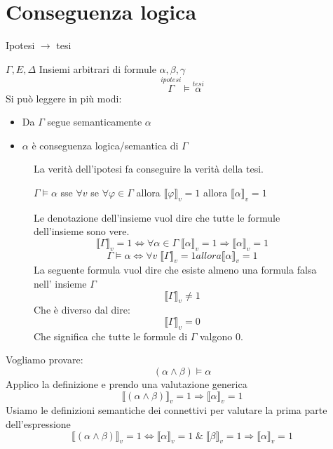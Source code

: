 \documentclass{article}
\theoremstyle{break}
\theoremstyle{break}
\theoremstyle{break}
\theoremstyle{break}
\begin{document}
\section{Conseguenza logica}
\begin{center}
  Ipotesi \( \to  \) tesi
\end{center}
\( \Gamma, E, \Delta \) Insiemi arbitrari di formule \( \alpha, \beta, \gamma \)
\[
  \stackrel{ipotesi}{\Gamma} \models \stackrel{tesi}{\alpha}
\]
Si può leggere in più modi:
\begin{itemize}
  \item Da \( \Gamma \) segue semanticamente \( \alpha \)
  \item \( \alpha \) è conseguenza logica/semantica di \( \Gamma \)
\end{itemize}
\begin{figure}[H]
  \begin{definition}
    La verità dell'ipotesi fa conseguire la verità della tesi.
    \begin{center}
      \( \Gamma \models \alpha \) sse \( \forall v \) se \( \forall \varphi \in \Gamma \) allora \( \llbracket \varphi\rrbracket_v = 1 \) allora \( \llbracket \alpha\rrbracket_v = 1 \)
    \end{center}
    Le denotazione dell'insieme vuol dire che tutte le formule dell'insieme
    sono vere.
    \[
      \llbracket \Gamma\rrbracket_v=1 \Leftrightarrow \forall \alpha \in \Gamma\; \llbracket \alpha\rrbracket_v = 1 \Rightarrow \llbracket \alpha\rrbracket_v = 1
    \]
    \[
      \Gamma \models \alpha \Leftrightarrow \forall v\; \llbracket \Gamma\rrbracket_v=1 allora \llbracket \alpha\rrbracket_v=1
    \]
    La seguente formula vuol dire che esiste almeno una formula falsa nell'
    insieme \( \Gamma \)
    \[
      \llbracket \Gamma\rrbracket_v \neq 1
    \]
    Che è diverso dal dire:
    \[
      \llbracket \Gamma\rrbracket_v = 0
    \]
    Che significa che tutte le formule di \( \Gamma \) valgono 0.
  \end{definition}
\end{figure}

\begin{exercise}[easy]
  Vogliamo provare:
  \[
    (\alpha \wedge \beta) \models \alpha
  \]
  Applico la definizione e prendo una valutazione generica
  \[
    \llbracket (\alpha \wedge \beta)\rrbracket_v =1 \Rightarrow \llbracket \alpha\rrbracket_v=1
  \]
  Usiamo le definizioni semantiche dei connettivi per valutare la prima parte dell'espressione
  \[
    \llbracket (\alpha \wedge \beta)\rrbracket_v=1 \Leftrightarrow \llbracket \alpha\rrbracket_v=1\; \&\; \llbracket \beta\rrbracket_v=1
    \Rightarrow \llbracket \alpha\rrbracket_v=1
  \]
\end{exercise}
\end{document}
